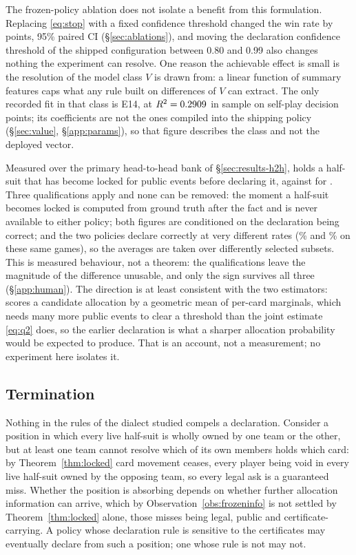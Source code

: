The frozen-policy ablation does not isolate a benefit from this formulation.
Replacing \eqref{eq:stop} with a fixed confidence threshold changed the win rate
by \numAblStop{} points, 95\% paired CI \numAblStopCI{} (\S\ref{sec:ablations}),
and moving the declaration confidence threshold of the shipped configuration
between 0.80 and 0.99 also changes nothing the experiment can resolve. One reason
the achievable effect is small is the resolution of the model class $V$ is drawn
from: a linear function of \numValueFeats{} summary features caps what any rule
built on differences of $V$ can extract. The only recorded fit in that class is
E14, at $R^2 = 0.2909$ in sample on \numValueRows{} self-play decision
points; its coefficients are not the ones compiled into the shipping policy
(\S\ref{sec:value}, \S\ref{app:params}), so that figure describes the class and
not the deployed vector.

Measured over the primary head-to-head bank of \S\ref{sec:results-h2h}, \vfast{}
holds a half-suit that has become locked for \numLockHoldFour{} public events
before declaring it, against \numLockHoldThree{} for \vthree{}. Three
qualifications apply and none can be removed: the moment a half-suit becomes
locked is computed from ground truth after the fact and is never available to
either policy; both figures are conditioned on the declaration being correct; and
the two policies declare correctly at very different rates
(\numVsVthreeDeclAcc{}\% and \numVthreeDeclAccSame{}\% on these same games), so
the averages are taken over differently selected subsets. This is measured
behaviour, not a theorem: the qualifications leave the magnitude of the
difference unusable, and only the sign survives all three
(\S\ref{app:human}). The direction is at least consistent with the two
estimators: \vthree{} scores a candidate allocation by a geometric mean of
per-card marginals, which needs many more public events to clear a threshold than
the joint estimate \eqref{eq:q2} does, so the earlier declaration is what a
sharper allocation probability would be expected to produce. That is an account,
not a measurement; no experiment here isolates it.

\subsection{Termination}
\label{sec:termination}

Nothing in the rules of the dialect studied compels a declaration. Consider a
position in which every live half-suit is wholly owned by one team or the other,
but at least one team cannot resolve which of its own members holds which card:
by Theorem~\ref{thm:locked} card movement ceases, every player being void in
every live half-suit owned by the opposing team, so every legal ask is a
guaranteed miss. Whether the position is absorbing depends on whether further
allocation information can arrive, which by Observation~\ref{obs:frozeninfo} is
not settled by Theorem~\ref{thm:locked} alone, those misses being legal, public
and certificate-carrying. A policy whose declaration rule is sensitive to the
certificates may eventually declare from such a position; one whose rule is not
may not.

